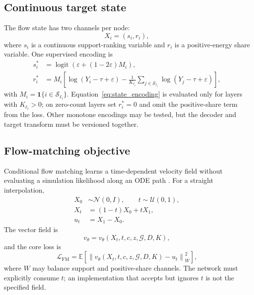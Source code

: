 \documentclass[11pt]{article}
\theoremstyle{definition}
\theoremstyle{remark}
\newcommand{\E}{\mathbb{E}}
\newcommand{\G}{\mathcal{G}}
\newcommand{\ind}{\mathbf{1}}
\newcommand{\logit}{\operatorname{logit}}
\begin{document}
\subsection{Continuous target state}
The flow state has two channels per node:
\begin{equation}
  X_i=(s_i,r_i),
\end{equation}
where $s_i$ is a continuous support-ranking variable and $r_i$ is a positive-energy share variable. One supervised encoding is
\begin{align}
  s_i^*&=\logit\!\left(\varepsilon+(1-2\varepsilon)M_i\right),\\
  r_i^*&=M_i\left[\log(Y_i-\tau+\varepsilon)-
  \frac{1}{K_{\ell_i}}\sum_{j\in\mathcal S_{\ell_i}}
  \log(Y_j-\tau+\varepsilon)\right],
  \label{eq:state_encoding}
\end{align}
with $M_i=\ind\{i\in\mathcal S_{\ell_i}\}$. Equation~\eqref{eq:state_encoding} is evaluated only for layers with $K_{\ell_i}>0$; on zero-count layers set $r_i^*=0$ and omit the positive-share term from the loss. Other monotone encodings may be tested, but the decoder and target transform must be versioned together.

\subsection{Flow-matching objective}
Conditional flow matching learns a time-dependent velocity field without evaluating a simulation likelihood along an ODE path \citep{flowmatching,otcfm}. For a straight interpolation,
\begin{align}
  X_0&\sim\mathcal N(0,I),\qquad t\sim\mathcal U(0,1),\\
  X_t&=(1-t)X_0+tX_1,\\
  u_t&=X_1-X_0.
\end{align}
The vector field is
\begin{equation}
  v_\theta=v_\theta(X_t,t,c,z,\G,D,K),
\end{equation}
and the core loss is
\begin{equation}
  \mathcal L_{\mathrm{FM}}
  =\E\left[\left\|v_\theta(X_t,t,c,z,\G,D,K)-u_t\right\|_W^2\right],
  \label{eq:fm_loss}
\end{equation}
where $W$ may balance support and positive-share channels. The network must explicitly consume $t$; an implementation that accepts but ignores $t$ is not the specified field.
\end{document}
